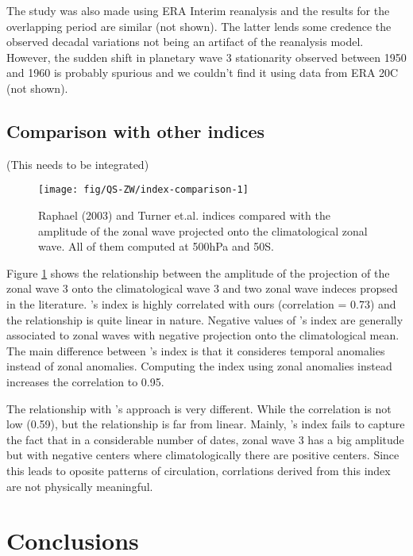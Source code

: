 \documentclass[draft,linenumbers]{agujournal2018}
\begin{document}
The study was also made using ERA Interim reanalysis and the results for
the overlapping period are similar (not shown). The latter lends some
credence the observed decadal variations not being an artifact of the
reanalysis model. However, the sudden shift in planetary wave 3
stationarity observed between 1950 and 1960 is probably spurious and we
couldn't find it using data from ERA 20C (not shown).

\subsection{Comparison with other indices}

(This needs to be integrated)

\begin{figure}[h]

{\centering \texttt{[image: fig/QS-ZW/index-comparison-1]} 

}

\caption{Raphael (2003) and Turner et.al. indices compared with the amplitude of the zonal wave projected onto the climatological zonal wave. All of them computed at 500hPa and 50\degree S.}\label{fig:index-comparison}
\end{figure}

Figure \ref{fig:index-comparison} shows the relationship between the
amplitude of the projection of the zonal wave 3 onto the climatological
wave 3 and two zonal wave indeces propsed in the literature.
\citet{raphael2004}'s index is highly correlated with ours (correlation
= 0.73) and the relationship is quite linear in nature. Negative values
of \citet{raphael2004}'s index are generally associated to zonal waves
with negative projection onto the climatological mean. The main
difference between \citet{raphael2004}'s index is that it consideres
temporal anomalies instead of zonal anomalies. Computing the index using
zonal anomalies instead increases the correlation to 0.95.

The relationship with \citet{turner2017}'s approach is very different.
While the correlation is not low (0.59), but the relationship is far
from linear. Mainly, \citet{turner2017}'s index fails to capture the
fact that in a considerable number of dates, zonal wave 3 has a big
amplitude but with negative centers where climatologically there are
positive centers. Since this leads to oposite patterns of circulation,
corrlations derived from this index are not physically meaningful.

\section{Conclusions}
\end{document}
